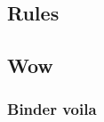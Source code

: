 
\renewcommand*\appendixtocname{Appendix}
\begin{appendices}
\chapter{Rules}
\section{Wow}
\subsection{Binder voila}



\end{appendices}
